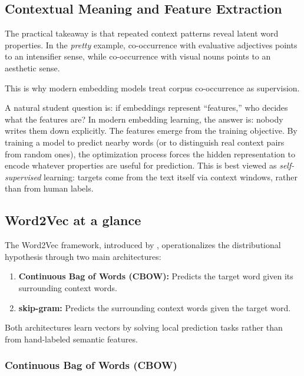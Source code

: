 \subsection{Contextual Meaning and Feature Extraction}
\label{sec:nlp_contextual_meaning_and_feature_extraction}

The practical takeaway is that repeated context patterns reveal latent word properties. In the \emph{pretty} example, co-occurrence with evaluative adjectives points to an intensifier sense, while co-occurrence with visual nouns points to an aesthetic sense.

This is why modern embedding models treat corpus co-occurrence as supervision.

\begin{tcolorbox}[summarybox, title={Author's note: who chooses the features?}]
A natural student question is: if embeddings represent ``features,'' who decides what the features are? In modern embedding learning, the answer is: nobody writes them down explicitly. The features emerge from the training objective. By training a model to predict nearby words (or to distinguish real context pairs from random ones), the optimization process forces the hidden representation to encode whatever properties are useful for prediction. This is best viewed as \emph{self-supervised} learning: targets come from the text itself via context windows, rather than from human labels.
\end{tcolorbox}

\subsection{Word2Vec at a glance}
\label{sec:nlp_word2vec_two_architectures}

The Word2Vec framework, introduced by \citet{Mikolov2013}, operationalizes the distributional hypothesis through two main architectures:

\begin{enumerate}
    \item \textbf{Continuous Bag of Words (CBOW):} Predicts the target word given its surrounding context words.
    \item \textbf{skip-gram:} Predicts the surrounding context words given the target word.
\end{enumerate}

Both architectures learn vectors by solving local prediction tasks rather than from hand-labeled semantic features.

\subsubsection{Continuous Bag of Words (CBOW)}
\label{sec:nlp_continuous_bag_of_words_cbow_sub}


